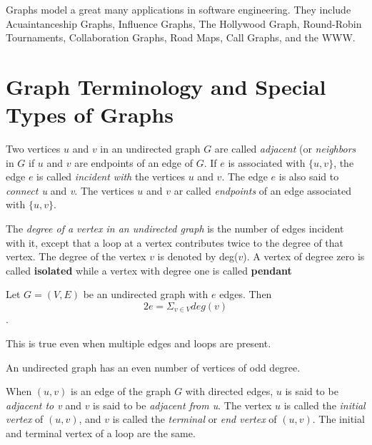 Graphs model a great many applications in software engineering. They include Acuaintanceship Graphs, Influence Graphs, The Hollywood Graph, Round-Robin Tournaments, Collaboration Graphs, Road Maps, Call Graphs, and the WWW.

\section {Graph Terminology and Special Types of Graphs}
\begin{definition}
Two vertices $u$ and $v$ in an undirected graph $G$ are called \textit{adjacent} (or \textit{neighbors} in $G$ if $u$ and $v$ are endpoints of an edge of $G$. If $e$ is associated with $\{u,v\}$, the edge $e$ is called \textit{incident with} the vertices $u$ and $v$. The edge $e$ is also said to \textit{connect u} and \textit{v}. The vertices $u$ and $v$ ar called \textit{endpoints} of an edge associated with $\{u,v\}$.
\end{definition}

\begin{definition}
The \textit{degree of a vertex in an undirected graph} is the number of edges incident with it, except that a loop at a vertex contributes twice to the degree of that vertex. The degree of the vertex $v$ is denoted by deg($v$). A vertex of degree zero is called \textbf{isolated} while a vertex with degree one is called \textbf{pendant}
\end{definition}

\begin{theorem} 
Let $G=(V,E)$ be an undirected graph with $e$ edges. Then 
$$2e = \Sigma_{v\in V} deg(v)$$.
\end{theorem}
\begin{notes}
This is true even when multiple edges and loops are present.
\end{notes}

\begin{theorem}
An undirected graph has an even number of vertices of odd degree.
\end{theorem}

\begin{definition}
When $(u,v)$ is an edge of the graph $G$ with directed edges, $u$ is said to be \textit{adjacent to v} and $v$ is said to be \textit{adjacent from u}. The vertex $u$ is called the \textit{initial vertex} of $(u,v)$, and $v$ is called the \textit{terminal} or \textit{end vertex} of $(u,v)$. The initial and terminal vertex of a loop are the same.
\end{definition}

